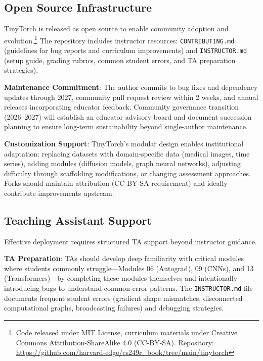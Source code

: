 \documentclass[10pt,twocolumn]{article}
\begin{document}
\subsection{Open Source Infrastructure}
\label{subsec:opensource}

TinyTorch is released as open source to enable community adoption and evolution.\footnote{Code released under MIT License, curriculum materials under Creative Commons Attribution-ShareAlike 4.0 (CC-BY-SA). Repository: \url{https://github.com/harvard-edge/cs249r_book/tree/main/tinytorch}} The repository includes instructor resources: \texttt{CONTRIBUTING.md} (guidelines for bug reports and curriculum improvements) and \texttt{INSTRUCTOR.md} (setup guide, grading rubrics, common student errors, and TA preparation strategies).

\textbf{Maintenance Commitment}: The author commits to bug fixes and dependency updates through 2027, community pull request review within 2 weeks, and annual releases incorporating educator feedback. Community governance transition (2026--2027) will establish an educator advisory board and document succession planning to ensure long-term sustainability beyond single-author maintenance.

\textbf{Customization Support}: TinyTorch's modular design enables institutional adaptation: replacing datasets with domain-specific data (medical images, time series), adding modules (diffusion models, graph neural networks), adjusting difficulty through scaffolding modifications, or changing assessment approaches. Forks should maintain attribution (CC-BY-SA requirement) and ideally contribute improvements upstream.

\subsection{Teaching Assistant Support}
\label{subsec:ta-support}

Effective deployment requires structured TA support beyond instructor guidance.

\textbf{TA Preparation}: TAs should develop deep familiarity with critical modules where students commonly struggle---Modules 06 (Autograd), 09 (CNNs), and 13 (Transformers)---by completing these modules themselves and intentionally introducing bugs to understand common error patterns. The \texttt{INSTRUCTOR.md} file documents frequent student errors (gradient shape mismatches, disconnected computational graphs, broadcasting failures) and debugging strategies.
\end{document}
